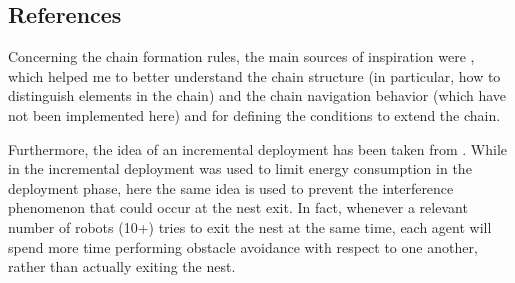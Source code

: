 \subsection{References}

Concerning the chain formation rules, the main sources of inspiration were \cite{nouyan2004chain}, \cite{nouyan2008path} which helped me to better understand the chain structure (in particular, how to distinguish elements in the chain) and the chain navigation behavior (which have not been implemented here) and \cite{goss1992harvesting} for defining the conditions to extend the chain.

Furthermore, the idea of an incremental deployment has been taken from \cite{stirling2013energy}.
While in \cite{stirling2013energy} the incremental deployment was used to limit energy consumption in the deployment phase, here the same idea is used to prevent the interference phenomenon that could occur at the nest exit.
In fact, whenever a relevant number of robots (10+) tries to exit the nest at the same time, each agent will spend more time performing obstacle avoidance with respect to one another, rather than actually exiting the nest.






